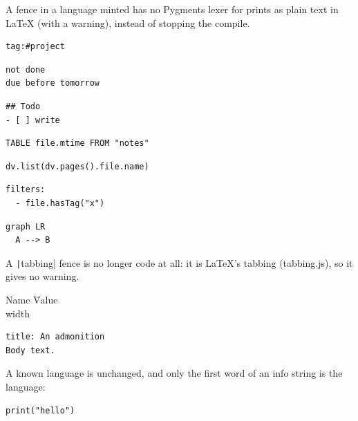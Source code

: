 A fence in a language minted has no Pygments lexer for prints as plain text in
LaTeX (with a warning), instead of stopping the compile.

\begin{verbatim}
tag:#project
\end{verbatim}

\begin{verbatim}
not done
due before tomorrow
\end{verbatim}

\begin{verbatim}
## Todo
- [ ] write
\end{verbatim}

\begin{verbatim}
TABLE file.mtime FROM "notes"
\end{verbatim}

\begin{verbatim}
dv.list(dv.pages().file.name)
\end{verbatim}

\begin{verbatim}
filters:
  - file.hasTag("x")
\end{verbatim}

\begin{verbatim}
graph LR
  A --> B
\end{verbatim}

A \texttt|tabbing| fence is no longer code at all: it is LaTeX's tabbing
(tabbing.js), so it gives no warning.

\begin{tabbing}
Name  \= Value \\
width 
\end{tabbing}

\begin{verbatim}
title: An admonition
Body text.
\end{verbatim}

A known language is unchanged, and only the first word of an info string is
the language:

\begin{verbatim}
print("hello")
\end{verbatim}

